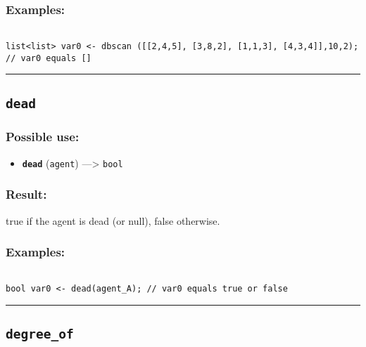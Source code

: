 \documentclass[]{book}
\providecommand{\tightlist}{%
  \setlength{\itemsep}{0pt}\setlength{\parskip}{0pt}}
\theoremstyle{definition}
\theoremstyle{definition}
\theoremstyle{definition}
\theoremstyle{remark}
\begin{document}
\subsubsection{Examples:}\label{examples-95}

\begin{verbatim}
 
list<list> var0 <- dbscan ([[2,4,5], [3,8,2], [1,1,3], [4,3,4]],10,2); // var0 equals []
\end{verbatim}

\begin{center}\rule{0.5\linewidth}{\linethickness}\end{center}

\subsection{\texorpdfstring{\texttt{dead}}{dead}}\label{dead}

\subsubsection{Possible use:}\label{possible-use-126}

\begin{itemize}
\tightlist
\item
  \textbf{\texttt{dead}} (\texttt{agent}) ---\textgreater{}
  \texttt{bool}
\end{itemize}

\subsubsection{Result:}\label{result-122}

true if the agent is dead (or null), false otherwise.

\subsubsection{Examples:}\label{examples-96}

\begin{verbatim}
 
bool var0 <- dead(agent_A); // var0 equals true or false
\end{verbatim}

\begin{center}\rule{0.5\linewidth}{\linethickness}\end{center}

\subsection{\texorpdfstring{\texttt{degree\_of}}{degree\_of}}\label{degree_of}
\end{document}
